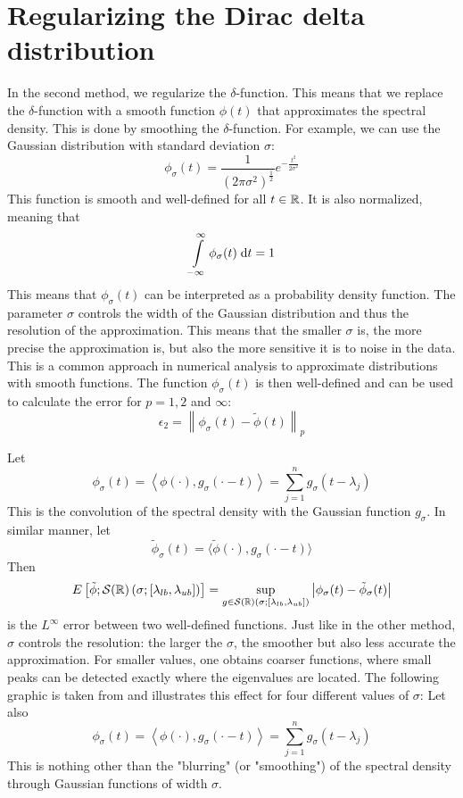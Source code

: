 \section{Regularizing the Dirac delta distribution}
In the second method, we regularize the $\delta$-function.
This means that we replace the $\delta$-function with a smooth function $\phi(t)$
that approximates the spectral density.
This is done by smoothing the $\delta$-function.
For example, we can use the Gaussian distribution with standard deviation $\sigma$:
$$\phi_{\sigma}(t) = \frac{1}{(2\pi\sigma^2)^\frac{1}{2}}e^{-\frac{t^2}{2\sigma^2}}$$
This function is smooth and well-defined for all $t \in \mathbb{R}$.
It is also normalized, meaning that
$$\int\limits_{-\infty}^{\infty} \phi_{\sigma}(t) \;\mathrm{d}t = 1$$
This means that $\phi_{\sigma}(t)$ can be interpreted as a probability density function.
The parameter $\sigma$ controls the width of the Gaussian distribution
and thus the resolution of the approximation.
This means that the smaller $\sigma$ is, the more precise the approximation is,
but also the more sensitive it is to noise in the data.
This is a common approach in numerical analysis to approximate distributions with smooth functions.
The function $\phi_{\sigma}(t)$ is then well-defined and can be used to calculate the error for $p=1, 2$ and $\infty$:
\[
\epsilon_2 = \left \| \phi_{\sigma}(t) - \tilde{\phi}(t) \right \|_p
\]

Let
\[
\phi_{\sigma}(t) = \left \langle \phi(\cdot), g_{\sigma}(\cdot - t)\right \rangle = \sum_{j = 1}^n g_{\sigma}(t - \lambda_j)
\]
This is the convolution of the spectral density with the Gaussian function $g_{\sigma}$.
In similar manner, let
\[
\tilde{\phi}_{\sigma}(t) = \langle \tilde{\phi}(\cdot), g_{\sigma}(\cdot - t) \rangle
\]
Then
\[
E\left[\tilde{\phi};\mathcal{S}(\mathbb{R})\left(\sigma; \left[\lambda_{lb}, \lambda_{ub} \right] \right)\right] = \sup_{g \in \mathcal{S}(\mathbb{R})(\sigma;[\lambda_{lb}, \lambda_{ub}])} \left| \phi_{\sigma}(t) - \tilde{\phi}_{\sigma}(t) \right|
\]
is the $L^\infty$ error between two well-defined functions.
Just like in the other method, $\sigma$ controls the resolution:
the larger the $\sigma$, the smoother but also less accurate the approximation.
For smaller values, one obtains coarser functions,
where small peaks can be detected exactly where the eigenvalues are located.
The following graphic is taken from \cite[p.~6]{linsaadyang14} and illustrates this effect for four different values of $\sigma$:
Let also
$$\phi_{\sigma}(t) = \left \langle \phi(\cdot), g_{\sigma}(\cdot - t)\right \rangle = \sum_{j = 1}^n g_{\sigma}(t - \lambda_j)$$
This is nothing other than the "blurring" (or "smoothing") of the spectral density through Gaussian functions of width $\sigma$.

